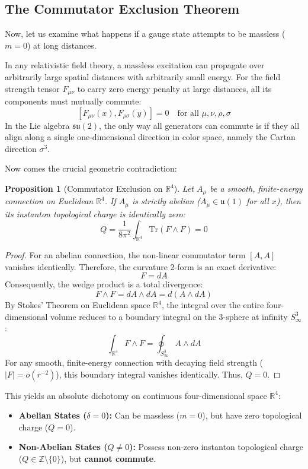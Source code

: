 \documentclass[11pt,a4paper]{article}
\newtheorem{proposition}[theorem]{Proposition}
\begin{document}
\subsection{The Commutator Exclusion Theorem}
Now, let us examine what happens if a gauge state attempts to be massless ($m = 0$) at long distances.

In any relativistic field theory, a massless excitation can propagate over arbitrarily large spatial distances with arbitrarily small energy. For the field strength tensor $F_{\mu\nu}$ to carry zero energy penalty at large distances, all its components must mutually commute:
$$[F_{\mu\nu}(x), F_{\rho\sigma}(y)] = 0 \quad \text{for all } \mu, \nu, \rho, \sigma$$
In the Lie algebra $\mathfrak{su}(2)$, the only way all generators can commute is if they all align along a single one-dimensional direction in color space, namely the Cartan direction $\sigma^3$.

Now comes the crucial geometric contradiction:
\begin{proposition}[Commutator Exclusion on $\mathbb{R}^4$]
Let $A_\mu$ be a smooth, finite-energy connection on Euclidean $\mathbb{R}^4$. If $A_\mu$ is strictly abelian ($A_\mu \in \mathfrak{u}(1)$ for all $x$), then its instanton topological charge is identically zero:
$$Q = \frac{1}{8\pi^2} \int_{\mathbb{R}^4} \mathrm{Tr}(F \wedge F) = 0$$
\end{proposition}
\begin{proof}
For an abelian connection, the non-linear commutator term $[A, A]$ vanishes identically. Therefore, the curvature 2-form is an exact derivative:
$$F = dA$$
Consequently, the wedge product is a total divergence:
$$F \wedge F = dA \wedge dA = d(A \wedge dA)$$
By Stokes' Theorem on Euclidean space $\mathbb{R}^4$, the integral over the entire four-dimensional volume reduces to a boundary integral on the 3-sphere at infinity $S^3_\infty$:
$$\int_{\mathbb{R}^4} F \wedge F = \oint_{S^3_\infty} A \wedge dA$$
For any smooth, finite-energy connection with decaying field strength ($|F| = o(r^{-2})$), this boundary integral vanishes identically. Thus, $Q = 0$.
\end{proof}

This yields an absolute dichotomy on continuous four-dimensional space $\mathbb{R}^4$:
\begin{itemize}
    \item \textbf{Abelian States ($\delta = 0$):} Can be massless ($m = 0$), but have zero topological charge ($Q = 0$).
    \item \textbf{Non-Abelian States ($Q \neq 0$):} Possess non-zero instanton topological charge ($Q \in \mathbb{Z} \setminus \{0\}$), but \textbf{cannot commute}.
\end{itemize}
\end{document}

